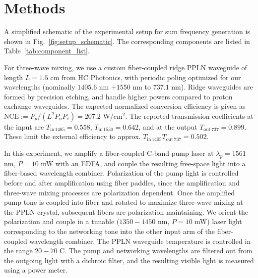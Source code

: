 \documentclass[floatfix,reprint,superscriptaddress,amsmath,amssymb,aps]{revtex4-2}
\begin{document}
\section{Methods}
A simplified schematic of the experimental setup for sum frequency generation is shown in Fig.~\ref{fig:setup_schematic}. 
The corresponding components are listed in Table~\ref{tab:component_list}. 
\par
For three-wave mixing, we use a custom fiber-coupled ridge PPLN waveguide of length $L = 1.5$ cm from HC Photonics, with periodic poling optimized for our wavelengths (nominally $1405.6$ nm $+ 1550$ nm to $737.1$ nm). Ridge waveguides are formed by precision etching, and handle higher powers compared to proton exchange waveguides. The expected normalized conversion efficiency is given as $\mathrm{NCE} := P_{p} / (L^{2} P_{n} P_{e}) = 207.2$ W/cm$^{2}$. The reported transmission coefficients at the input are $T_{\mathrm{in}\,1405} = 0.558$, $T_{\mathrm{in}\,1550} = 0.642$, and at the output $T_{\mathrm{out}\,737} = 0.899$. These limit the external efficiency to approx. $T_{\mathrm{in}\,1405} T_{\mathrm{out}\,737} = 0.502$.
\par
In this experiment, we amplify a fiber-coupled C-band pump laser at $\lambda_{p} = 1561$ nm, $P = 10$ mW with an EDFA, and couple the resulting free-space light into a fiber-based wavelength combiner. Polarization of the pump light is controlled before and after amplification using fiber paddles, since the amplification and three-wave mixing processes are polarization dependent. Once the amplified pump tone is coupled into fiber and rotated to maximize three-wave mixing at the PPLN crystal, subsequent fibers are polarization maintaining. We orient the polarization and couple in a tunable ($1350 - 1450$ nm, $P = 10$ mW) laser light corresponding to the networking tone into the other input arm of the fiber-coupled wavelength combiner. The PPLN waveguide temperature is controlled in the range $20 - 70$ C. The pump and networking wavelengths are filtered out from the outgoing light with a dichroic filter, and the resulting visible light is measured using a power meter.  

\end{document}
